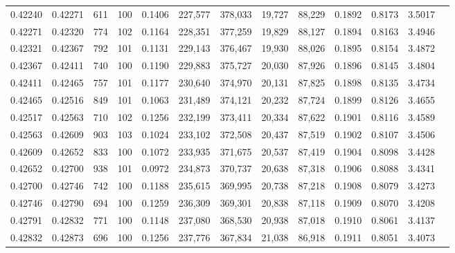 \begin{tabular}{rrrrrrrrrrrrr}
0.42240 & 0.42271 &   611 & 100 &                                     0.1406 & 227,577 & 378,033 &  19,727 &  88,229 & 0.1892 & 0.8173 & 3.5017 \\
0.42271 & 0.42320 &   774 & 102 &                                     0.1164 & 228,351 & 377,259 &  19,829 &  88,127 & 0.1894 & 0.8163 & 3.4946 \\
0.42321 & 0.42367 &   792 & 101 &                                     0.1131 & 229,143 & 376,467 &  19,930 &  88,026 & 0.1895 & 0.8154 & 3.4872 \\
0.42367 & 0.42411 &   740 & 100 &                                     0.1190 & 229,883 & 375,727 &  20,030 &  87,926 & 0.1896 & 0.8145 & 3.4804 \\
0.42411 & 0.42465 &   757 & 101 &                                     0.1177 & 230,640 & 374,970 &  20,131 &  87,825 & 0.1898 & 0.8135 & 3.4734 \\
0.42465 & 0.42516 &   849 & 101 &                                     0.1063 & 231,489 & 374,121 &  20,232 &  87,724 & 0.1899 & 0.8126 & 3.4655 \\
0.42517 & 0.42563 &   710 & 102 &                                     0.1256 & 232,199 & 373,411 &  20,334 &  87,622 & 0.1901 & 0.8116 & 3.4589 \\
0.42563 & 0.42609 &   903 & 103 &                                     0.1024 & 233,102 & 372,508 &  20,437 &  87,519 & 0.1902 & 0.8107 & 3.4506 \\
0.42609 & 0.42652 &   833 & 100 &                                     0.1072 & 233,935 & 371,675 &  20,537 &  87,419 & 0.1904 & 0.8098 & 3.4428 \\
0.42652 & 0.42700 &   938 & 101 &                                     0.0972 & 234,873 & 370,737 &  20,638 &  87,318 & 0.1906 & 0.8088 & 3.4341 \\
0.42700 & 0.42746 &   742 & 100 &                                     0.1188 & 235,615 & 369,995 &  20,738 &  87,218 & 0.1908 & 0.8079 & 3.4273 \\
0.42746 & 0.42790 &   694 & 100 &                                     0.1259 & 236,309 & 369,301 &  20,838 &  87,118 & 0.1909 & 0.8070 & 3.4208 \\
0.42791 & 0.42832 &   771 & 100 &                                     0.1148 & 237,080 & 368,530 &  20,938 &  87,018 & 0.1910 & 0.8061 & 3.4137 \\
0.42832 & 0.42873 &   696 & 100 &                                     0.1256 & 237,776 & 367,834 &  21,038 &  86,918 & 0.1911 & 0.8051 & 3.4073 \\

\end{tabular}
